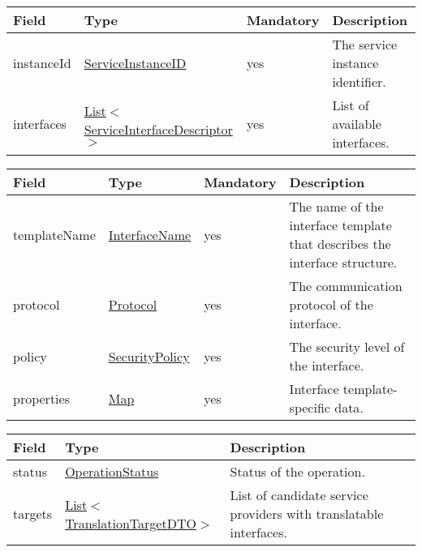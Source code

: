 \documentclass[a4paper]{arrowhead}
\newcommand{\pref}[1]{{\textcolor{ArrowheadGrey}{\hyperref[sec:model:primitives:#1]{#1}}}}
\begin{document}
\begin{table}[ht!]
\begin{tabularx}{\textwidth}{| p{3cm} | p{5.5cm} | p{2cm} | X |} \hline
\rowcolor{gray!33} Field & Type & Mandatory & Description \\ \hline
instanceId & \pref{ServiceInstanceID} & yes & The service instance identifier. \\ \hline
interfaces & \pref{List}$<$\hyperref[sec:model:ServiceInterfaceDescriptor]{ServiceInterfaceDescriptor}$>$ & yes & List of available interfaces. \\ \hline
\end{tabularx}
\end{table}

 
\begin{table}[ht!]
\begin{tabularx}{\textwidth}{| p{2.5cm} | p{3cm} | p{2cm} | X |} \hline
\rowcolor{gray!33} Field & Type & Mandatory & Description \\ \hline
templateName & \pref{InterfaceName} & yes & The name of the interface template that describes the interface structure. \\ \hline
protocol & \pref{Protocol} & yes & The communication protocol of the interface.  \\ \hline
policy & \pref{SecurityPolicy} & yes & The security level of the interface. \\ \hline
properties &\hyperref[sec:model:Map]{Map} & yes & Interface template-specific data. \\ \hline
\end{tabularx}
\end{table}

\clearpage

 
\begin{table}[ht!]
\begin{tabularx}{\textwidth}{| p{1.5cm} | p{4.5cm} | X |} \hline
\rowcolor{gray!33} Field & Type      & Description \\ \hline
status & \pref{OperationStatus} & Status of the operation. \\ \hline
targets & \pref{List}$<$\hyperref[sec:model:TranslationTargetDTO]{TranslationTargetDTO}$>$ & List of candidate service providers with translatable interfaces. \\ \hline
\end{tabularx}
\end{table}
\end{document}
